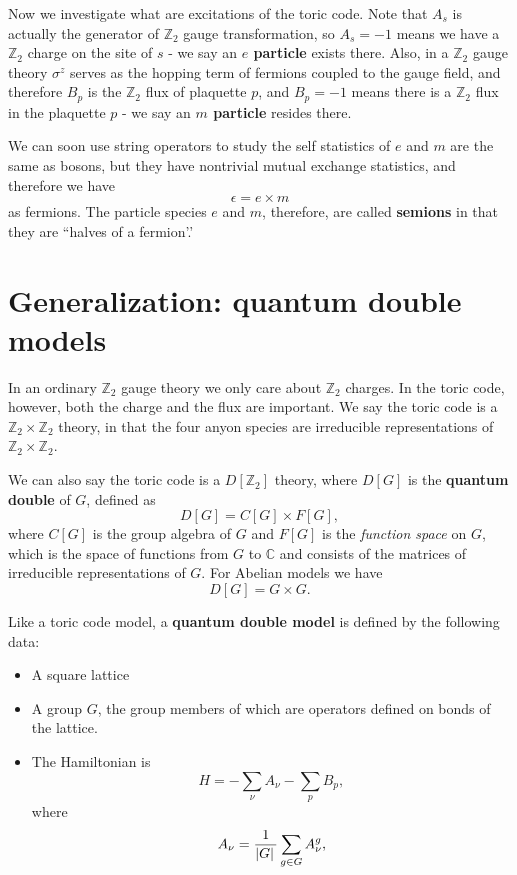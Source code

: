 \documentclass[hyperref, a4paper]{article}
\newcommand*{\concept}[1]{{\textbf{#1}}}
\begin{document}
Now we investigate what are excitations of the toric code. Note that $A_s$ is actually the generator of $\mathbb{Z}_2$ gauge transformation, so $A_s = -1$ means we have a $\mathbb{Z}_2$ charge on the site of $s$ - we say an \concept{$e$ particle} exists there.
Also, in a $\mathbb{Z}_2$ gauge theory $\sigma^z$ serves as the hopping term of fermions coupled to the gauge field,
and therefore $B_p$ is the $\mathbb{Z}_2$ flux of plaquette $p$, and $B_p = -1$ means there is a $\mathbb{Z}_2$ flux in the plaquette $p$ - we say an \concept{$m$ particle} resides there.

We can soon use string operators to study the self statistics of $e$ and $m$ are the same as bosons, but they have nontrivial mutual exchange statistics, and therefore we have 
\begin{equation}
    \epsilon = e \times m
\end{equation}
as fermions.
The particle species $e$ and $m$, therefore, are called \concept{semions} in that they are ``halves of a fermion'.'

\section{Generalization: quantum double models}

In an ordinary $\mathbb{Z}_2$ gauge theory we only care about $\mathbb{Z}_2$ charges.
In the toric code, however, both the charge and the flux are important.
We say the toric code is a $\mathbb{Z}_2 \times \mathbb{Z}_2$ theory, in that the four anyon species are irreducible representations of $\mathbb{Z}_2 \times \mathbb{Z}_2$.

We can also say the toric code is a $D[\mathbb{Z}_2]$ theory, where $D[G]$ is the \concept{quantum double} of $G$, defined as
\begin{equation}
    D[G] = C[G] \times F[G],
\end{equation}
where $C[G]$ is the group algebra of $G$ and $F[G]$ is the \emph{function space} on $G$, which is the space of functions from $G$ to $\mathbb{C}$ and consists of the matrices of irreducible representations of $G$.
For Abelian models we have 
\begin{equation}
    D[G] = G \times G.
\end{equation}

Like a toric code model, a \concept{quantum double model} is defined by the following data:
\begin{itemize}
    \item A square lattice 
    \item A group $G$, the group members of which are operators defined on bonds of the lattice.
    \item The Hamiltonian is 
    \begin{equation}
        H = - \sum_\nu A_\nu - \sum_p B_p,
    \end{equation}
    where 
    \begin{equation}
        A_\nu = \frac{1}{\abs*{G}} \sum_{g \in G} A_\nu^g,
    \end{equation}
\end{itemize}
\end{document}
